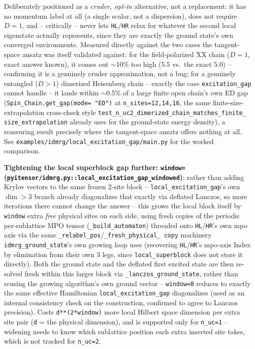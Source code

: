 \documentclass[11pt]{article}
\begin{document}
Deliberately positioned as a \emph{cruder, opt-in} alternative, not a
replacement: it has no momentum label at all (a single scalar, not a
dispersion), does not require $D=1$, and -- critically -- never lets
\texttt{HL}/\texttt{HR} relax for whatever the second local eigenstate
actually represents, since they are exactly the ground state's own
converged environments. Measured directly against the two cases the
tangent-space ansatz was itself validated against: for the
field-polarized XX chain ($D=1$, exact answer known), it comes out
$\sim$10\% too high (5.5 vs.\ the exact 5.0) -- confirming it is a
genuinely cruder approximation, not a bug; for a genuinely entangled
($D>1$) dimerized Heisenberg chain -- exactly the case
\texttt{excitation\_gap} cannot handle -- it lands within $\sim$0.5\% of a
large finite open chain's own ED gap (\texttt{Spin\_Chain.get\_gap(mode=
"ED")} at \texttt{n\_sites=12,14,16}, the same finite-size-extrapolation
cross-check style \texttt{test\_n\_uc2\_dimerized\_chain\_matches\_finite\_
size\_extrapolation} already uses for the ground-state energy density), a
reassuring result precisely where the tangent-space ansatz offers nothing
at all. See \texttt{examples/idmrg/local\_excitation\_gap/main.py} for the
worked comparison.

\textbf{Tightening the local superblock gap further: \texttt{window=}
(\texttt{pyitensor/idmrg.py::local\_excitation\_gap\_windowed})}: rather
than adding Krylov vectors to the same frozen 2-site block --
\texttt{local\_excitation\_gap}'s own $\dim>3$ branch already
diagonalizes that exactly via deflated Lanczos, so more iterations there
cannot change the answer -- this grows the local block itself by
\texttt{window} extra \emph{free} physical sites on each side, using fresh
copies of the periodic per-sublattice MPO tensor
(\texttt{\_build\_automaton}) threaded onto \texttt{HL}/\texttt{HR}'s own
mpo axis via the same \texttt{\_relabel\_pos}/\texttt{\_fresh\_physical\_
copy} machinery \texttt{idmrg\_ground\_state}'s own growing loop uses
(recovering \texttt{HL}/\texttt{HR}'s mpo-axis Index by elimination from
their own 3 legs, since \texttt{local\_superblock} does not store it
directly). Both the ground state and the deflated first excited state are
then re-solved fresh within this larger block via
\texttt{\_lanczos\_ground\_state}, rather than reusing the growing
algorithm's own ground vector -- \texttt{window=0} reduces to exactly the
same effective Hamiltonian \texttt{local\_excitation\_gap} diagonalizes
(used as an internal consistency check on the construction, confirmed to
agree to Lanczos precision). Costs \texttt{d**(2*window)} more local
Hilbert space dimension per extra site pair (\texttt{d} = the physical
dimension), and is supported only for \texttt{n\_uc=1} -- widening needs
to know which sublattice position each extra inserted site takes, which
is not tracked for \texttt{n\_uc=2}.
\end{document}

